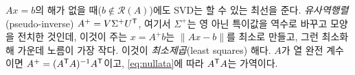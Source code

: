 \documentclass[11pt]{article}
\begin{document}
\begin{remark}[최소제곱]
$Ax=b$의 해가 없을 때($b\notin\mathcal R(A)$)에도 SVD는 할 수 있는 최선을 준다.
\emph{유사역행렬}(pseudo-inverse) $A^{+}=V\Sigma^{+}U^{\mathsf{T}}$, 여기서 $\Sigma^{+}$는 영
아닌 특이값을 역수로 바꾸고 모양을 전치한 것인데, 이것이 주는 $x=A^{+}b$는
$\|Ax-b\|$를 최소로 만들고, 그런 최소화 해 가운데 노름이 가장 작다. 이것이
\emph{최소제곱}(least squares) 해다. $A$가 열 완전 계수이면
$A^{+}=(A^{\mathsf{T}} A)^{-1}A^{\mathsf{T}}$이고, \eqref{eq:nullata}에 따라 $A^{\mathsf{T}} A$는 가역이다.
\end{remark}
\end{document}
